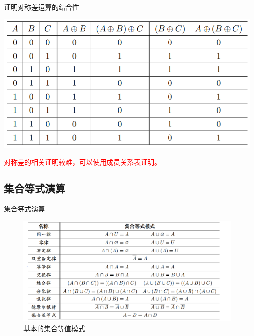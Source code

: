 \documentclass[xetex,10pt,aspectratio=43]{beamer}
\begin{document}
	\begin{frame}{证明对称差运算的结合性}
		
		\centering\includegraphics[scale=0.5]{1.png}
		
		\textcolor{red}{对称差的相关证明较难，可以使用成员关系表证明。}	
		
	\end{frame}
	
	\subsection{集合等式演算}
	
	\begin{frame}{集合等式演算}
		
	\begin{figure}
		
		\centering
		
		\includegraphics[scale=0.4]{5.png}
		
		\caption{基本的集合等值模式}
		
	\end{figure}
		
	\end{frame}
\end{document}
